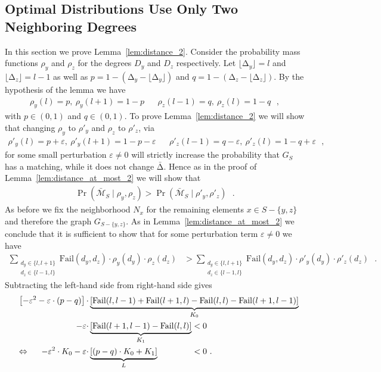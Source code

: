 \let\accentvec\vec \documentclass{llncs}
\newcommand{\degr}{\ensuremath{d}}
\newcommand{\randv}{\ensuremath{D}}
\newcommand{\pmf}{\ensuremath{{\rho}}}
\newcommand{\mean}{{\mathrm{\scriptstyle\Delta}}}
\newcommand{\Amean}{\bar{\mean}}
\newcommand{\floor}[1]{\ensuremath{\lfloor #1\rfloor}}
\newcommand{\eps}{\ensuremath{\varepsilon}}
\newcommand{\blank}{\text{ }}
\newcommand{\graph}{\ensuremath{G}}
\newcommand{\low}{\ensuremath{l}}
\newcommand{\evNM}{\bar{\mathcal{M}}}
\newcommand{\Fail}{\mathrm{Fail}}
\begin{document}
\subsection{Optimal Distributions Use Only Two Neighboring Degrees}
\label{sec:lemma_distance_2}
In this section we prove Lemma~\ref{lem:distance_2}.
Consider the probability mass functions $\pmf_y$ and $\pmf_z$ for the degrees $\randv_y$ and $\randv_z$ respectively.
Let $\floor{\mean_y}=\low$ and $\floor{\mean_z}=\low-1$ as well as $p=1-(\mean_y-\floor{\mean_y})$ and $q=1-(\mean_z-\floor{\mean_z})$.
By the hypothesis of the lemma we have 
\begin{align*}
\pmf_y(\low)  =p, \ \pmf_y(\low+1)=1-p && \pmf_z(\low-1)=q, \ \pmf_z(\low)  =1-q \blank,
\end{align*}
with $p\in(0,1)$ and $q\in(0,1)$. To prove Lemma~\ref{lem:distance_2} we will show that
changing $\pmf_y$ to $\pmf'_y$ and $\pmf_z$ to $\pmf'_z$, via
\begin{align*}
\pmf'_y(\low)=p+\eps, \ \pmf'_y(\low+1) =1-p-\eps && \pmf'_z(\low-1)=q-\eps, \ \pmf'_z(\low)=1-q+\eps \blank,
\end{align*}
for some small perturbation $\eps \neq 0$ will strictly increase the probability that $\graph_S$ has a matching, while it does not change $\Amean$. 
Hence as in the proof of Lemma~\ref{lem:distance_at_most_2} we will show that
\begin{align*}
\Pr\left( \evNM_S \mid \pmf_y,\pmf_z \right) > \Pr\left( \evNM_S \mid \pmf'_y, \pmf'_z\right) \blank.
\end{align*}
As before we fix the neighborhood $N_x$ for the remaining elements $x \in S-\{y,z\}$ and therefore the graph $\graph_{S-\{y,z\}}$.
As in Lemma~\ref{lem:distance_at_most_2} we conclude that it is sufficient to show that for some perturbation term $\eps \neq 0$ we have
\begin{align*}
   \sum_{\substack{\degr_y\in\{\low,\low+1\}\\\degr_z\in\{\low-1,\low\}}} \Fail(\degr_y,\degr_z) \cdot \rho_y(\degr_y)\cdot\rho_z(\degr_z) 
 &> \sum_{\substack{\degr_y\in\{\low,\low+1\}\\\degr_z\in\{\low-1,\low\}}} \Fail(\degr_y,\degr_z) \cdot \rho'_y(\degr_y)\cdot\rho'_z(\degr_z) \blank. 
\end{align*}
Subtracting the left-hand side from right-hand side gives
\begin{align}
\label{eq:failure_lemma_3_eps}
 &&\left[ -\eps^2-\eps\cdot(p-q)\right]\cdot & \underbrace{\left[\Fail(\low,\low-1)+\Fail(\low+1,\low)-\Fail(\low,\low)-\Fail(\low+1,\low-1) \right]}_{K_0}\notag\\
 &&-\eps \cdot &\underbrace{\left[ \Fail(\low+1,\low-1)-\Fail(\low,\low)\right]}_{K_1}<0\notag\\
&&\Leftrightarrow \hspace{0.5cm}-\eps^2\cdot K_0 -\eps\cdot& \underbrace{\left[ (p-q)\cdot K_0+K_1\right]}_L\hspace{1.45cm}<0 \blank.
\end{align}
\end{document}
